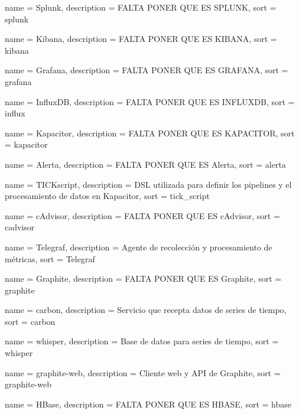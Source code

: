  {
  name        = {Splunk},
  description = {FALTA PONER QUE ES SPLUNK},
  sort        = {splunk}
}

 {
  name        = {Kibana},
  description = {FALTA PONER QUE ES KIBANA},
  sort        = {kibana}
}

 {
  name        = {Grafana},
  description = {FALTA PONER QUE ES GRAFANA},
  sort        = {grafana}
}

 {
  name        = {InfluxDB},
  description = {FALTA PONER QUE ES INFLUXDB},
  sort        = {influx}
}

 {
  name        = {Kapacitor},
  description = {FALTA PONER QUE ES KAPACITOR},
  sort        = {kapacitor}
}

 {
  name        = {Alerta},
  description = {FALTA PONER QUE ES Alerta},
  sort        = {alerta}
}

 {
  name        = {TICKscript},
  description =
    {DSL utilizada para definir los pipelines y el procesamiento de datos en
    Kapacitor},
  sort        = {tick_script}
}

 {
  name        = {cAdvisor},
  description = {FALTA PONER QUE ES cAdvisor},
  sort        = {cadvisor}
}

 {
  name        = {Telegraf},
  description = {Agente de recolección y procesamiento de métricas},
  sort        = {Telegraf}
}

 {
  name        = {Graphite},
  description = {FALTA PONER QUE ES Graphite},
  sort        = {graphite}
}

 {
  name        = {carbon},
  description = {Servicio que recepta datos de series de tiempo},
  sort        = {carbon}
}

 {
  name        = {whisper},
  description = {Base de datos para series de tiempo},
  sort        = {whisper}
}

 {
  name        = {graphite-web},
  description = {Cliente web y API de Graphite},
  sort        = {graphite-web}
}

 {
  name        = {HBase},
  description = {FALTA PONER QUE ES HBASE},
  sort        = {hbase}
}

